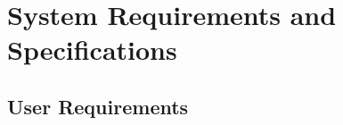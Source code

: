 \documentclass[../MasterThesis.tex]{subfiles}
\begin{document}
	
	
	

%
%
%
%
%
%
%
%
\newpage
\section{System Requirements and Specifications} \label{section:systemrequirementsandspecifications}




\subsection{User Requirements} \label{subsection:userrequirements}




\end{document}
